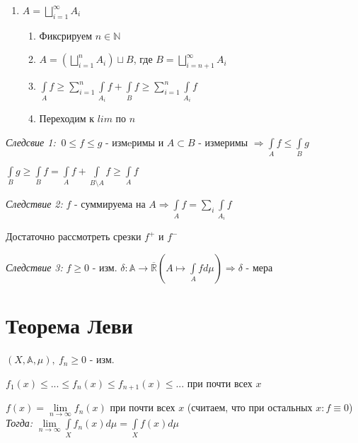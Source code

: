 \documentclass[paper=a4, fontsize=13.2pt]{article}
\begin{document}
\begin{enumerate}
\begin{enumerate}
	\item $A = \bigsqcup\limits_{i = 1}^{\infty}A_{i}$
		\begin{enumerate}
			\item Фиксрируем $n \in \mathbb{N}$

			\item $A = (\bigsqcup\limits_{i=1}^{n}A_{i}) \sqcup B$, где $B = \bigsqcup\limits_{i=n+1}^{\infty}A_{i}$

			\item $\int\limits_{A}f \geqslant \sum\limits_{i=1}^{n} \int\limits_{A_i}f + \int\limits_{B}f \geqslant \sum\limits_{i=1}^{n} \int\limits_{A_i}f$

			\item Переходим к $lim$ по $n$
		\end{enumerate}

	\end{enumerate}

\end{enumerate}

\emph{Следсвие 1:}
$\ 0 \leqslant f \leqslant g$ - измeримы и  $A \subset B$ - измеримы $\Rightarrow \int\limits_{A}f \leqslant \int\limits_{B}g$

$\int\limits_{B}g \geqslant \int\limits_{B}f = \int\limits_{A}f + \int\limits_{B \setminus A}f \geqslant \int\limits_{A}f$

\bigskip

\emph{Следствие 2:}
$f$ - суммируема на $A \Rightarrow \int\limits_{A}f = \sum\limits_{i} \int\limits_{A_{i}}f$

Достаточно рассмотреть срезки $f^+$ и $f^-$

\bigskip

\emph{Следствие 3:}
$f \geqslant 0$ - изм. $\delta: \mathbb{A} \rightarrow \mathbb{\overline{R}}(A\longmapsto \int\limits_{A}fd\mu) \Rightarrow \delta$ - мера

\section{Теорема Леви}
$(X,\mathds{A},\mu),\ f_n \geqslant 0$ - изм.

$f_1(x) \leqslant ...\leqslant f_n(x) \leqslant f_{n+1}(x) \leqslant ...$ при почти всех $x$

$f(x) = \lim\limits_{n \rightarrow \infty}f_n(x)$ при почти всех $x$ (считаем, что при остальных $x: f \equiv 0$)
\\

\emph{Тогда:} $\lim\limits_{n \rightarrow \infty} \int\limits_{X}f_n(x)d\mu = \int\limits_{X}f(x)d\mu$
\\
\end{document}
